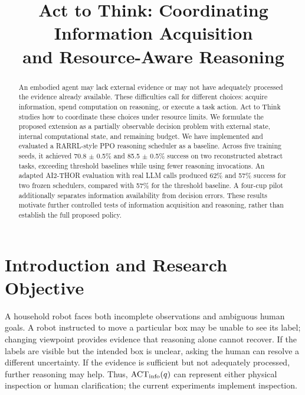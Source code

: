 \documentclass[conference]{IEEEtran}
\title{Act to Think: Coordinating Information Acquisition\\and Resource-Aware Reasoning}
\author{\IEEEauthorblockN{Qining Shen}\IEEEauthorblockA{Johns Hopkins University\\601.697 Human-Centered Robotics --- Midterm Report\\November 11, 2026}}
\begin{document}
\maketitle
\begin{abstract}
An embodied agent may lack external evidence or may not have adequately processed the evidence already available. These difficulties call for different choices: acquire information, spend computation on reasoning, or execute a task action. Act to Think studies how to coordinate these choices under resource limits. We formulate the proposed extension as a partially observable decision problem with external state, internal computational state, and remaining budget. We have implemented and evaluated a RARRL-style PPO reasoning scheduler as a baseline. Across five training seeds, it achieved 70.8 $\pm$ 0.5\% and 85.5 $\pm$ 0.5\% success on two reconstructed abstract tasks, exceeding threshold baselines while using fewer reasoning invocations. An adapted AI2-THOR evaluation with real LLM calls produced 62\% and 57\% success for two frozen schedulers, compared with 57\% for the threshold baseline. A four-cup pilot additionally separates information availability from decision errors. These results motivate further controlled tests of information acquisition and reasoning, rather than establish the full proposed policy.
\end{abstract}

\section{Introduction and Research Objective}
A household robot faces both incomplete observations and ambiguous human goals. A robot instructed to move a particular box may be unable to see its label; changing viewpoint provides evidence that reasoning alone cannot recover. If the labels are visible but the intended box is unclear, asking the human can resolve a different uncertainty. If the evidence is sufficient but not adequately processed, further reasoning may help. Thus, $\mathrm{ACT}_{\rm info}(q)$ can represent either physical inspection or human clarification; the current experiments implement inspection.
\end{document}
